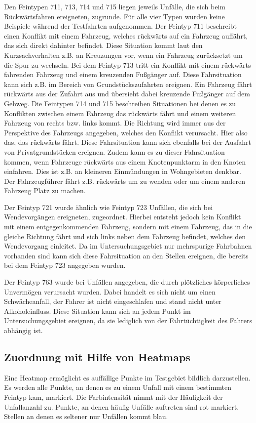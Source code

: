 Den Feintypen 711, 713, 714 und 715 liegen jeweils Unfälle, die sich beim Rückwärtsfahren ereigneten, zugrunde. Für alle vier Typen wurden keine Beispiele während der Testfahrten aufgenommen. Der Feintyp 711 beschreibt einen Konflikt mit einem Fahrzeug, welches rückwärts auf ein Fahrzeug auffährt, das sich direkt dahinter befindet. Diese Situation kommt laut den Kurzsachverhalten z.B. an Kreuzungen vor, wenn ein Fahrzeug zurücksetzt um die Spur zu wechseln. Bei dem Feintyp 713 tritt ein Konflikt mit einem rückwärts fahrenden Fahrzeug und einem kreuzenden Fußgänger auf. Diese Fahrsituation kann sich z.B. im Bereich von Grundstückszufahrten ereignen. Ein Fahrzeug fährt rückwärts aus der Zufahrt aus und übersieht dabei kreuzende Fußgänger auf dem Gehweg. Die Feintypen 714 und 715 beschreiben Situationen bei denen es zu Konflikten zwischen einem Fahrzeug das rückwärts fährt und einem weiteren Fahrzeug von rechts bzw. links kommt. Die Richtung wird immer aus der Perspektive des Fahrzeugs angegeben, welches den Konflikt verursacht. Hier also das, das rückwärts fährt. Diese Fahrsituation kann sich ebenfalls bei der Ausfahrt von Privatgrundstücken ereignen. Zudem kann es zu dieser Fahrsituation kommen, wenn Fahrzeuge rückwärts aus einem Knotenpunktarm in den Knoten einfahren. Dies ist z.B. an kleineren Einmündungen in Wohngebieten denkbar. Der Fahrzeugführer fährt z.B. rückwärts um zu wenden oder um einem anderen Fahrzeug Platz zu machen.

Der Feintyp 721 wurde ähnlich wie Feintyp 723 Unfällen, die sich bei Wendevorgängen ereigneten, zugeordnet. Hierbei entsteht jedoch kein Konflikt mit einem entgegenkommenden Fahrzeug, sondern mit einem Fahrzeug, das in die gleiche Richtung fährt und sich links neben dem Fahrzeug befindet, welches den Wendevorgang einleitet. Da im Untersuchungsgebiet nur mehrspurige Fahrbahnen vorhanden sind kann sich diese Fahrsituation an den Stellen ereignen, die bereits bei dem Feintyp 723 angegeben wurden.

Der Feintyp 763 wurde bei Unfällen angegeben, die durch plötzliches körperliches Unvermögen verursacht wurden. Dabei handelt es sich nicht um einen Schwächeanfall, der Fahrer ist nicht eingeschlafen und stand nicht unter Alkoholeinfluss. Diese Situation kann sich an jedem Punkt im Untersuchungsgebiet ereignen, da sie lediglich von der Fahrtüchtigkeit des Fahrers abhängig ist.

\subsection{Zuordnung mit Hilfe von Heatmaps}\label{section:Heatmaps}
Eine Heatmap ermöglicht es auffällige Punkte im Testgebiet bildlich darzustellen. Es werden alle Punkte, an denen es zu einem Unfall mit einem bestimmten Feintyp kam, markiert. Die Farbintensität nimmt mit der Häufigkeit der Unfallanzahl zu. Punkte, an denen häufig Unfälle auftreten sind rot markiert. Stellen an denen es seltener nur Unfällen kommt blau.


